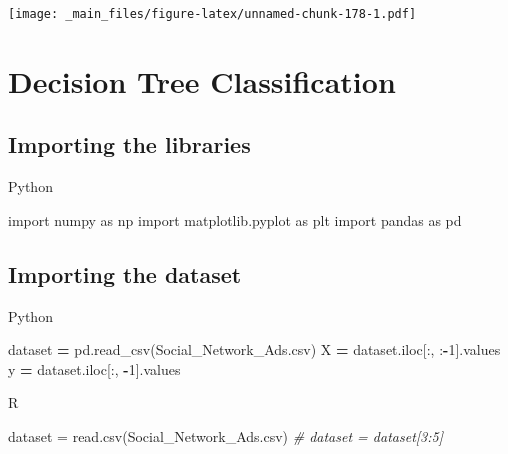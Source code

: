 \documentclass[
]{book}
\newenvironment{Shaded}{\begin{snugshade}}{\end{snugshade}}
\newcommand{\CommentTok}[1]{\textcolor[rgb]{0.56,0.35,0.01}{\textit{#1}}}
\newcommand{\DecValTok}[1]{\textcolor[rgb]{0.00,0.00,0.81}{#1}}
\newcommand{\FunctionTok}[1]{\textcolor[rgb]{0.00,0.00,0.00}{#1}}
\newcommand{\ImportTok}[1]{#1}
\newcommand{\NormalTok}[1]{#1}
\newcommand{\OperatorTok}[1]{\textcolor[rgb]{0.81,0.36,0.00}{\textbf{#1}}}
\newcommand{\OtherTok}[1]{\textcolor[rgb]{0.56,0.35,0.01}{#1}}
\newcommand{\StringTok}[1]{\textcolor[rgb]{0.31,0.60,0.02}{#1}}
\theoremstyle{definition}
\theoremstyle{definition}
\theoremstyle{definition}
\theoremstyle{definition}
\theoremstyle{remark}
\begin{document}
\texttt{[image: \_main\_files/figure-latex/unnamed-chunk-178-1.pdf]}

\hypertarget{decision-tree-classification}{%
\section{Decision Tree Classification}\label{decision-tree-classification}}

\hypertarget{importing-the-libraries-12}{%
\subsection{Importing the libraries}\label{importing-the-libraries-12}}

Python

\begin{Shaded}
\begin{Highlighting}[]
\ImportTok{import}\NormalTok{ numpy }\ImportTok{as}\NormalTok{ np}
\ImportTok{import}\NormalTok{ matplotlib.pyplot }\ImportTok{as}\NormalTok{ plt}
\ImportTok{import}\NormalTok{ pandas }\ImportTok{as}\NormalTok{ pd}
\end{Highlighting}
\end{Shaded}

\hypertarget{importing-the-dataset-12}{%
\subsection{Importing the dataset}\label{importing-the-dataset-12}}

Python

\begin{Shaded}
\begin{Highlighting}[]
\NormalTok{dataset }\OperatorTok{=}\NormalTok{ pd.read\_csv(}\StringTok{\textquotesingle{}Social\_Network\_Ads.csv\textquotesingle{}}\NormalTok{)}
\NormalTok{X }\OperatorTok{=}\NormalTok{ dataset.iloc[:, :}\OperatorTok{{-}}\DecValTok{1}\NormalTok{].values}
\NormalTok{y }\OperatorTok{=}\NormalTok{ dataset.iloc[:, }\OperatorTok{{-}}\DecValTok{1}\NormalTok{].values}
\end{Highlighting}
\end{Shaded}

R

\begin{Shaded}
\begin{Highlighting}[]
\NormalTok{dataset }\OtherTok{=} \FunctionTok{read.csv}\NormalTok{(}\StringTok{\textquotesingle{}Social\_Network\_Ads.csv\textquotesingle{}}\NormalTok{)}
\CommentTok{\# dataset = dataset[3:5]}
\end{Highlighting}
\end{Shaded}
\end{document}
